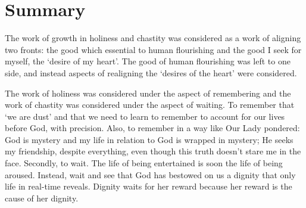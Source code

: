 \documentclass[12pt]{article}
\begin{document}
\section*{Summary}

The work of growth in holiness and chastity was considered as a work of aligning two fronts: the good which essential to human flourishing and the good I seek for myself, the `desire of my heart'. The good of human flourishing was left to one side, and instead aspects of realigning the `desires of the heart' were considered.

The work of holiness was considered under the aspect of remembering and the work of chastity was considered under the aspect of waiting. To remember that `we are dust' and that we need to learn to remember to account for our lives before God, with precision. Also, to remember in a way like Our Lady pondered: God is mystery and my life in relation to God is wrapped in mystery; He seeks my friendship, despite everything, even though this truth doesn't stare me in the face. Secondly, to wait. The life of being entertained is soon the life of being aroused. Instead, wait and see that God has bestowed on us a dignity that only life in real-time reveals. Dignity waits for her reward because her reward is the cause of her dignity.
\end{document}
